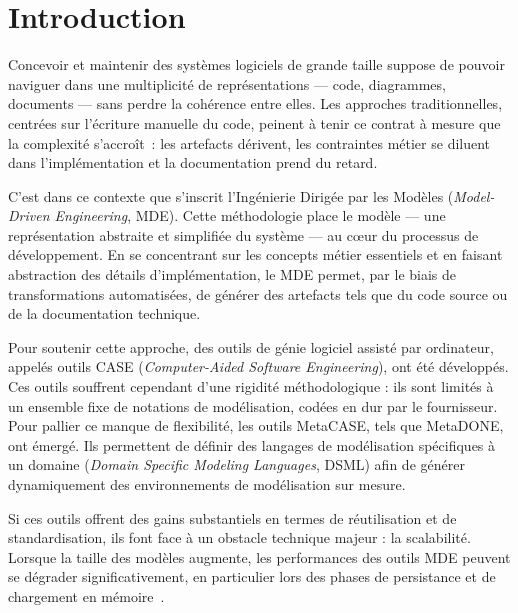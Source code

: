 \chapter{Introduction}
\label{chap:introduction}

Concevoir et maintenir des systèmes logiciels de grande taille suppose de pouvoir naviguer dans une multiplicité de représentations --- code, diagrammes, documents --- sans perdre la cohérence entre elles. Les approches traditionnelles, centrées sur l'écriture manuelle du code, peinent à tenir ce contrat à mesure que la complexité s'accroît~: les artefacts dérivent, les contraintes métier se diluent dans l'implémentation et la documentation prend du retard.

C'est dans ce contexte que s'inscrit l'Ingénierie Dirigée par les Modèles (\textit{Model-Driven Engineering}, MDE). Cette méthodologie place le modèle — une représentation abstraite et simplifiée du système — au cœur du processus de développement. En se concentrant sur les concepts métier essentiels et en faisant abstraction des détails d'implémentation, le MDE permet, par le biais de transformations automatisées, de générer des artefacts tels que du code source ou de la documentation technique.

Pour soutenir cette approche, des outils de génie logiciel assisté par ordinateur, appelés outils CASE (\textit{Computer-Aided Software Engineering}), ont été développés. Ces outils souffrent cependant d'une rigidité méthodologique : ils sont limités à un ensemble fixe de notations de modélisation, codées en dur par le fournisseur. Pour pallier ce manque de flexibilité, les outils MetaCASE, tels que MetaDONE, ont émergé. Ils permettent de définir des langages de modélisation spécifiques à un domaine (\textit{Domain Specific Modeling Languages}, DSML) afin de générer dynamiquement des environnements de modélisation sur mesure.

Si ces outils offrent des gains substantiels en termes de réutilisation et de standardisation, ils font face à un obstacle technique majeur : la scalabilité. Lorsque la taille des modèles augmente, les performances des outils MDE peuvent se dégrader significativement, en particulier lors des phases de persistance et de chargement en mémoire~\cite{kolovos2013research}.

